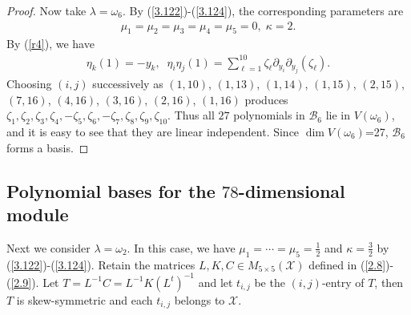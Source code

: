 \documentclass[12pt]{article}
\numberwithin{equation}{section}
\theoremstyle{definition}
\theoremstyle{remark}
\begin{document}
\begin{proof}
	 Now take $\lambda=\omega_6$. By (\ref{3.122})-(\ref{3.124}), the corresponding parameters are
	 \begin{eqnarray}
	 	\mu_1=\mu_2=\mu_3=\mu_4=\mu_5=0,\;\kappa=2.
	 \end{eqnarray}
	 By (\ref{r4}), we have
	 \begin{eqnarray}
	 	\eta_k(1)=-y_k,\;\;\eta_i\eta_j(1)=\sum_{\ell=1}^{10}\zeta_\ell\partial_{y_i}\partial_{y_j}(\zeta_{\ell}).
	 \end{eqnarray}
	 Choosing $(i,j)$ successively as $(1,10)$, $(1,13)$, $(1,14)$, $(1,15)$, $(2,15)$, $(7,16)$, $(4,16)$, $(3,16)$, $(2,16)$, $(1,16)$
	 produces $\zeta_1,\zeta_2,\zeta_3,\zeta_4,-\zeta_5,\zeta_6,-\zeta_7,\zeta_8,\zeta_9,\zeta_{10}$. Thus all $27$ polynomials in $\mathcal{B}_6$ lie in $V(\omega_6)$, and it is easy to see that they are linear independent. Since $\dim V(\omega_6)$=27, $\mathcal{B}_6$ forms a basis.
\end{proof}

\subsection{Polynomial bases for the $78$-dimensional module}

Next we consider $\lambda=\omega_2$. In this case, we have $\mu_1=\cdots=\mu_5=\frac{1}{2}$ and $\kappa=\frac{3}{2}$ by (\ref{3.122})-(\ref{3.124}). Retain the matrices $L,K,C\in M_{5\times 5}(\mathscr{X})$ defined in (\ref{2.8})-(\ref{2.9}). Let $T=L^{-1}C=L^{-1}K(L^t)^{-1}$ and let $t_{i,j}$ be the $(i,j)$-entry of $T$, then $T$ is skew-symmetric and each $t_{i,j}$ belongs to $\mathscr{X}$.
\end{document}
